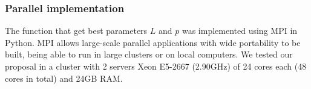 \documentclass[compress,red]{beamer}
\begin{document}
%
%



\begin{frame}
\frametitle{Parallel implementation}
The function that get best parameters $L$ and $p$ was implemented using MPI in Python. MPI allows large-scale parallel applications
with wide portability to be built, being able to run in large clusters
or on local computers.
We tested our proposal in a cluster with 2 servers Xeon E5-2667 (2.90GHz)
of 24 cores each (48 cores in total) and 24GB RAM.
\end{frame}
\end{document}
